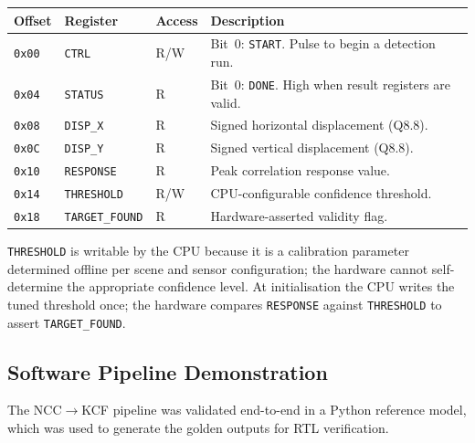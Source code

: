 \documentclass[12pt,a4paper]{article}
\begin{document}
\begin{center}
\renewcommand{\arraystretch}{1.3}
\begin{tabular}{C{1.8cm} L{2.8cm} C{1.8cm} L{6.5cm}}
\toprule
{}
\textbf{Offset} & \textbf{Register} & \textbf{Access} & \textbf{Description} \\
\midrule
\texttt{0x00} & \texttt{CTRL}         & R/W & Bit~0: \texttt{START}. Pulse to begin a detection run. \\
\texttt{0x04} & \texttt{STATUS}       & R   & Bit~0: \texttt{DONE}. High when result registers are valid. \\
\texttt{0x08} & \texttt{DISP\_X}      & R   & Signed horizontal displacement (Q8.8). \\
\texttt{0x0C} & \texttt{DISP\_Y}      & R   & Signed vertical displacement (Q8.8). \\
\texttt{0x10} & \texttt{RESPONSE}     & R   & Peak correlation response value. \\
\texttt{0x14} & \texttt{THRESHOLD}    & R/W & CPU-configurable confidence threshold. \\
\texttt{0x18} & \texttt{TARGET\_FOUND}& R   & Hardware-asserted validity flag. \\
\bottomrule
\end{tabular}
\end{center}

\texttt{THRESHOLD} is writable by the CPU because it is a calibration parameter determined offline per scene and sensor configuration; the hardware cannot self-determine the appropriate confidence level. At initialisation the CPU writes the tuned threshold once; the hardware compares \texttt{RESPONSE} against \texttt{THRESHOLD} to assert \texttt{TARGET\_FOUND}.

\subsection{Software Pipeline Demonstration}

The NCC$\to$KCF pipeline was validated end-to-end in a Python reference model, which was used to generate the golden outputs for RTL verification.
\end{document}
